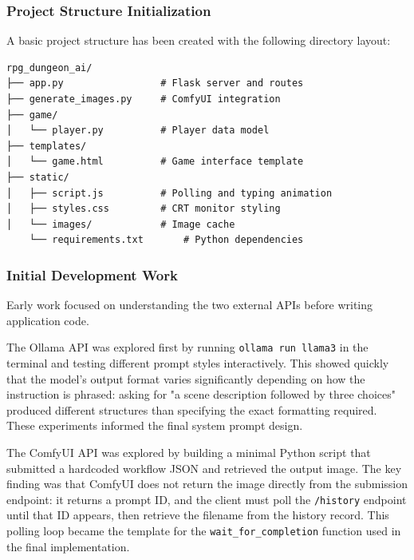 \documentclass[12pt,a4paper]{article}
\begin{document}
    \newpage
    \subsubsection{Project Structure Initialization}

    A basic project structure has been created with the following directory layout:

    \vspace{0.5em}

    \noindent
    \begin{minipage}{\textwidth}
    \begin{lstlisting}[language={}, basicstyle=\ttfamily\footnotesize, breaklines=false]
    rpg_dungeon_ai/
├── app.py                 # Flask server and routes
├── generate_images.py     # ComfyUI integration
├── game/
│   └── player.py          # Player data model
├── templates/
│   └── game.html          # Game interface template
├── static/
│   ├── script.js          # Polling and typing animation
│   ├── styles.css         # CRT monitor styling
│   └── images/            # Image cache
    └── requirements.txt       # Python dependencies
    \end{lstlisting}
    \end{minipage}

    \subsubsection{Initial Development Work}

Early work focused on understanding the two external APIs before writing application code.

The Ollama API was explored first by running \texttt{ollama run llama3} in the terminal and testing different prompt styles interactively. This showed quickly that the model's output format varies significantly depending on how the instruction is phrased: asking for "a scene description followed by three choices" produced different structures than specifying the exact formatting required. These experiments informed the final system prompt design.

The ComfyUI API was explored by building a minimal Python script that submitted a hardcoded workflow JSON and retrieved the output image. The key finding was that ComfyUI does not return the image directly from the submission endpoint: it returns a prompt ID, and the client must poll the \texttt{/history} endpoint until that ID appears, then retrieve the filename from the history record. This polling loop became the template for the \texttt{wait\_for\_completion} function used in the final implementation.
\end{document}
